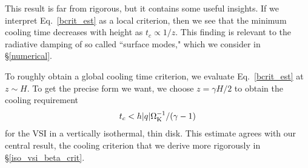 \documentclass[iop]{emulateapj}
\newcommand{\p}{\partial}
\def \OmK {\Omega_{\rm K}}
\begin{document}
This result is far from rigorous, but it contains some useful insights.
 If we interpret Eq.\ \ref{bcrit_est} as a local criterion, then we see that 
 the minimum cooling time decreases with height as $t_c \propto 1/z$.
 This finding is relevant to the radiative damping of so called ``surface 
 modes," which we consider in \S\ref{numerical}.
 
 To roughly obtain a global cooling time criterion, we evaluate Eq.\ \ref{bcrit_est}
 at $z \sim H$.  To get the precise form we want, we choose $z = \gamma H / 2$ to 
 obtain the cooling requirement
 \begin{align}\label{prelim_bcrit}
 t_c <  h |q| \OmK^{-1}/ (\gamma - 1)
\end{align}   
for the VSI in a vertically isothermal, thin disk.  This estimate agrees with 
our central result, the cooling criterion that we derive more rigorously in \S\ref{iso_vsi_beta_crit}.


%
%
%
%
%
%
%
 
\end{document}
